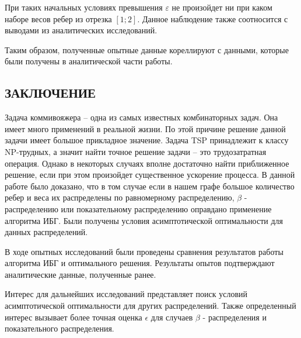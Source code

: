 \documentclass[a4paper, 14pt]{extarticle}
\numberwithin{equation}{section}
\begin{document}
При таких начальных условиях превышения $\varepsilon$ не произойдет ни при каком наборе весов ребер из отрезка $[1;2]$. Данное наблюдение также соотносится с выводами из аналитических исследований.

Таким образом, полученные опытные данные кореллируют с данными, которые были получены в аналитической части работы.

\newpage

\begin{center}
\chapter{\textbf{ЗАКЛЮЧЕНИЕ}}
\end{center}

Задача коммивояжера -- одна из самых известных комбинаторных задач. 
Она имеет много применений в реальной жизни. По этой причине решение данной задачи имеет большое прикладное значение. Задача TSP принадлежит к классу NP-трудных, а значит найти точное решение задачи -- это трудозатратная операция. Однако в некоторых случаях вполне достаточно найти приближенное решение, если при этом произойдет существенное ускорение процесса. В данной работе было доказано, что в том случае если в нашем графе большое количество ребер и веса их распределены по равномерному распределению, $\beta$ - распределению или показательному распределению оправдано применение алгоритма ИБГ. Были получены условия асимптотической оптимальности для данных распределений.

В ходе опытных исследований были проведены сравнения результатов работы алгоритма ИБГ и оптимального решения. Результаты опытов подтверждают аналитические данные, полученные ранее.

Интерес для дальнейших исследований представляет поиск условий асимптотической оптимальности для других распределений. Также определенный интерес вызывает более точная оценка $\epsilon$ для случаев $\beta$ - распределения и показательного распределения.


\newpage
 
 
\end{document}
